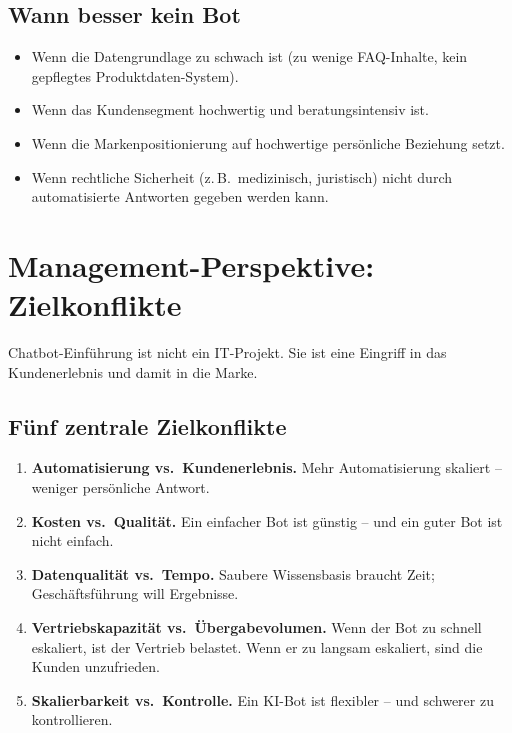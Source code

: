 \documentclass[11pt,a4paper,oneside]{article}
\begin{document}
\subsection{Wann besser kein Bot}

\begin{itemize}
  \item Wenn die Datengrundlage zu schwach ist (zu wenige FAQ-Inhalte, kein gepflegtes Produktdaten-System).
  \item Wenn das Kundensegment hochwertig und beratungsintensiv ist.
  \item Wenn die Markenpositionierung auf hochwertige persönliche Beziehung setzt.
  \item Wenn rechtliche Sicherheit (z.\,B.\ medizinisch, juristisch) nicht durch automatisierte Antworten gegeben werden kann.
\end{itemize}

\section{Management-Perspektive: Zielkonflikte}

Chatbot-Einführung ist nicht ein IT-Projekt. Sie ist eine Eingriff in das Kundenerlebnis und damit in die Marke.

\subsection{Fünf zentrale Zielkonflikte}

\begin{enumerate}
  \item \textbf{Automatisierung vs.\ Kundenerlebnis.} Mehr Automatisierung skaliert -- weniger persönliche Antwort.
  \item \textbf{Kosten vs.\ Qualität.} Ein einfacher Bot ist günstig -- und ein guter Bot ist nicht einfach.
  \item \textbf{Datenqualität vs.\ Tempo.} Saubere Wissensbasis braucht Zeit; Geschäftsführung will Ergebnisse.
  \item \textbf{Vertriebskapazität vs.\ Übergabevolumen.} Wenn der Bot zu schnell eskaliert, ist der Vertrieb belastet. Wenn er zu langsam eskaliert, sind die Kunden unzufrieden.
  \item \textbf{Skalierbarkeit vs.\ Kontrolle.} Ein KI-Bot ist flexibler -- und schwerer zu kontrollieren.
\end{enumerate}
\end{document}
